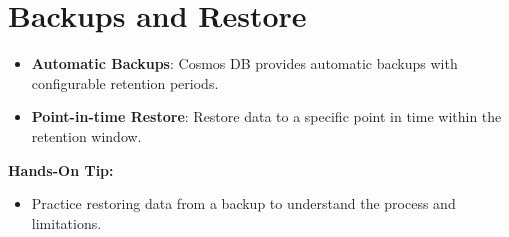\documentclass{article}
\begin{document}
\section{Backups and Restore}
\begin{itemize}
    \item \textbf{Automatic Backups}: Cosmos DB provides automatic backups with configurable retention periods.
    \item \textbf{Point-in-time Restore}: Restore data to a specific point in time within the retention window.
\end{itemize}

\textbf{Hands-On Tip:}
\begin{itemize}
    \item Practice restoring data from a backup to understand the process and limitations.
\end{itemize}
\end{document}
